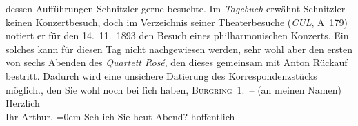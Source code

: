 \begin{ledgroupsized}[t]{13cm}
{{{                  dessen Aufführungen Schnitzler gerne
                  besuchte. Im \emph{Tagebuch} erwähnt Schnitzler keinen Konzertbesuch, doch
                  im Verzeichnis seiner Theaterbesuche (\emph{CUL}, A 179) notiert
                  er für den 14. 11. 1893 den Besuch eines philharmonischen Konzerts. Ein
                  solches kann für diesen Tag nicht nachgewiesen werden, sehr wohl aber den ersten von 
                  sechs Abenden des \emph{Quartett Rosé}, den dieses gemeinsam mit 
                  Anton Rückauf bestritt. Dadurch wird eine unsichere 
               Datierung des Korrespondenzstücks möglich.}}}\label{K_L00268-1h}, den Sie wohl noch bei ſich haben, {\pb}\textsc{Burgring 1}. – (an meinen Namen)\pend
           \pstart
           Herzlich{\\[\baselineskip]}Ihr \spacefill\mbox{Arthur.}\pend
           \leftskip=0em{}\pstart
           \noindent{}Seh ich Sie heut Abend? hoffentlich\pend
           
         
         \endnumbering{}\end{ledgroupsized}  \newcommand{\dateiname}{L00268}\newcommand{\titel}{Arthur Schnitzler an Richard Beer-Hofmann, [14. 11.? 1893]}\newcommand{\editorInnen}{Martin Anton Müller und Gerd-Hermann Susen}
      